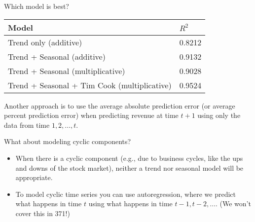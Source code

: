 \documentclass{beamer}\usepackage[]{graphicx}\usepackage[]{color}
\begin{document}
\begin{darkframes}
\begin{frame}{Which model is best?}
      \begin{center}
        \begin{tabular}{ll}
          \hline
          Model & $R^2$ \\
          \hline
          Trend only (additive) & 0.8212 \\
          Trend + Seasonal (additive) & 0.9132 \\
          Trend + Seasonal (multiplicative) & 0.9028 \\
          Trend + Seasonal + Tim Cook (multiplicative) & 0.9524 \\
          \hline
        \end{tabular}
      \end{center}

      \pause

      Another approach is to use the average absolute prediction error (or average percent prediction error) when predicting revenue at time $t+1$ using only the data from time $1,2,\ldots, t$.
    \end{frame}

    \begin{frame}{What about modeling cyclic components?}
      \begin{itemize}
        \item When there is a \alert{cyclic} component (e.g., due to business cycles, like the ups and downs of the stock market), neither a trend nor seasonal model will be appropriate.
        \item To model cyclic time series you can use \alert{autoregression}, where we predict what happens in time $t$ using what happens in time $t-1, t-2, \ldots$. (We won't cover this in 371!)
      \end{itemize}
    \end{frame}
  \end{darkframes}
\end{document}
